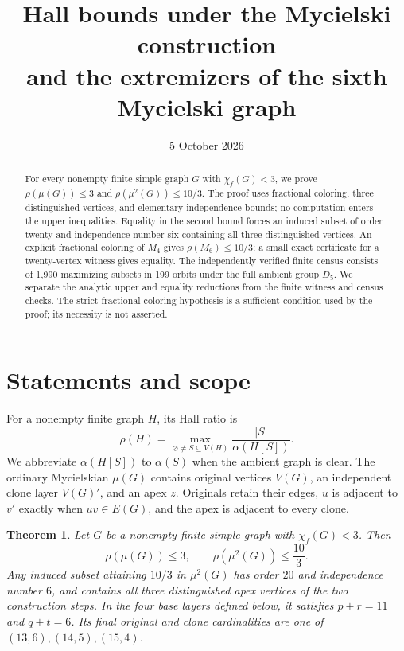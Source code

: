 \documentclass[11pt,letterpaper]{article}
\title{Hall bounds under the Mycielski construction\\
and the extremizers of the sixth Mycielski graph}
\author{}
\date{5 October 2026}
\newtheorem{theorem}{Theorem}[section]
\theoremstyle{remark}
\newcommand{\abs}[1]{\lvert #1\rvert}
\begin{document}
\maketitle
\vspace{-1.5em}
\begin{abstract}
For every nonempty finite simple graph $G$ with $\chi_f(G)<3$, we prove
$\rho(\mu(G))\le3$ and $\rho(\mu^2(G))\le10/3$. The proof uses fractional
coloring, three distinguished vertices, and elementary independence
bounds; no computation enters the upper inequalities. Equality in the
second bound forces an induced subset of order twenty and independence
number six containing all three distinguished vertices. An explicit
fractional coloring of $M_4$ gives $\rho(M_6)\le10/3$; a small exact
certificate for a twenty-vertex witness gives equality. The independently
verified finite census consists of 1,990 maximizing subsets in 199 orbits
under the full ambient group $D_5$. We separate the analytic upper and
equality reductions from the finite witness and census checks. The
strict fractional-coloring hypothesis is a sufficient condition used by
the proof; its necessity is not asserted.
\end{abstract}

\section{Statements and scope}
For a nonempty finite graph $H$, its Hall ratio is
\[
 \rho(H)=\max_{\varnothing\ne S\subseteq V(H)}
 \frac{\abs S}{\alpha(H[S])}.
\]
We abbreviate $\alpha(H[S])$ to $\alpha(S)$ when the ambient graph is clear.
The ordinary Mycielskian $\mu(G)$ contains original vertices $V(G)$, an
independent clone layer $V(G)'$, and an apex $z$. Originals retain their
edges, $u$ is adjacent to $v'$ exactly when $uv\in E(G)$, and the apex
is adjacent to every clone.

\begin{theorem}\label{thm:general}
Let $G$ be a nonempty finite simple graph with $\chi_f(G)<3$. Then
\begin{equation}\label{eq:main}
 \rho(\mu(G))\le3,\qquad \rho(\mu^2(G))\le\frac{10}{3}.
\end{equation}
Any induced subset attaining $10/3$ in $\mu^2(G)$ has order $20$ and
independence number $6$, and contains all three distinguished apex
vertices of the two construction steps. In the four base layers defined
below, it satisfies $p+r=11$ and $q+t=6$. Its final original and clone
cardinalities are one of $(13,6),(14,5),(15,4)$.
\end{theorem}
\end{document}
